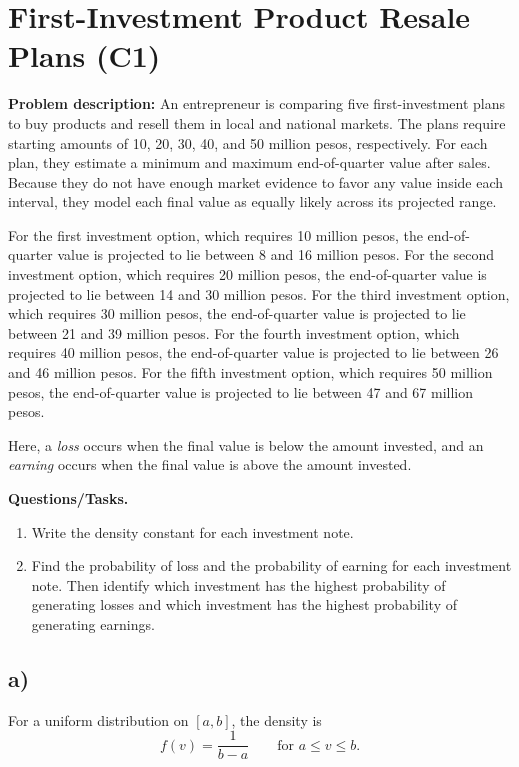 	\section{First-Investment Product Resale Plans (C1)}
	
	\textbf{Problem description:}
	An entrepreneur is comparing five first-investment plans to buy products and resell them in local and national markets. The plans require starting amounts of 10, 20, 30, 40, and 50 million pesos, respectively. For each plan, they estimate a minimum and maximum end-of-quarter value after sales. Because they do not have enough market evidence to favor any value inside each interval, they model each final value as equally likely across its projected range.
	
	For the first investment option, which requires 10 million pesos, the end-of-quarter value is projected to lie between 8 and 16 million pesos. For the second investment option, which requires 20 million pesos, the end-of-quarter value is projected to lie between 14 and 30 million pesos. For the third investment option, which requires 30 million pesos, the end-of-quarter value is projected to lie between 21 and 39 million pesos. For the fourth investment option, which requires 40 million pesos, the end-of-quarter value is projected to lie between 26 and 46 million pesos. For the fifth investment option, which requires 50 million pesos, the end-of-quarter value is projected to lie between 47 and 67 million pesos.
	
	Here, a \emph{loss} occurs when the final value is below the amount invested, and an \emph{earning} occurs when the final value is above the amount invested.
	
	\textbf{Questions/Tasks.}
	\begin{enumerate}[label=\textbf{\alph*)}]
		\item Write the density constant for each investment note.
		\item Find the probability of loss and the probability of earning for each investment note. Then identify which investment has the highest probability of generating losses and which investment has the highest probability of generating earnings.
	\end{enumerate}
	
	\subsection*{a)}
	For a uniform distribution on $[a,b]$, the density is
	\[
	f(v)=\frac{1}{b-a}\qquad \text{for }a\le v\le b.
	\]
	
